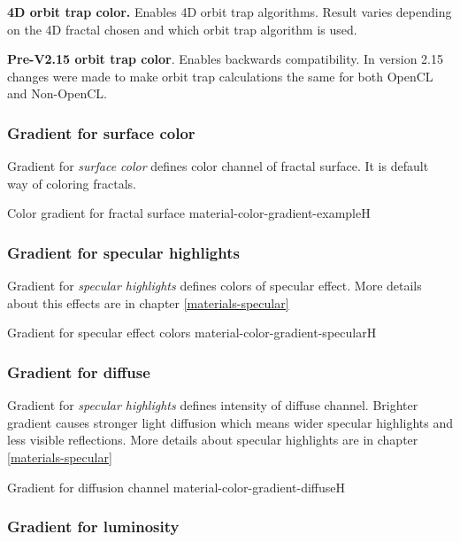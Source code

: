 \textbf{4D orbit trap color.} Enables 4D orbit trap algorithms. Result varies depending on the 4D fractal chosen and which orbit trap algorithm is used.

\textbf{Pre-V2.15 orbit trap color}. Enables backwards compatibility. In version 2.15 changes were made to make orbit trap calculations the same for both OpenCL and  Non-OpenCL.

\subsubsection{Gradient for surface color}\label{materials-surface_color-gradient}

Gradient for \emph{surface color} defines color channel of fractal surface. It is default way of coloring fractals.

{Color gradient for fractal surface}
{material-color-gradient-example}{H}

\subsubsection{Gradient for specular highlights}\label{materials-specular-gradient}

Gradient for \emph{specular highlights} defines colors of specular effect. More details about this effects are in chapter \ref{materials-specular}

{Gradient for specular effect colors}
{material-color-gradient-specular}{H}

\subsubsection{Gradient for diffuse}\label{materials-diffuse-gradient}

Gradient for \emph{specular highlights} defines intensity of diffuse channel. Brighter gradient causes stronger light diffusion which means wider specular highlights and less visible reflections. More details about specular highlights are in chapter \ref{materials-specular}

{Gradient for diffusion channel}
{material-color-gradient-diffuse}{H}

\subsubsection{Gradient for luminosity}\label{materials-luminosity-gradient}

